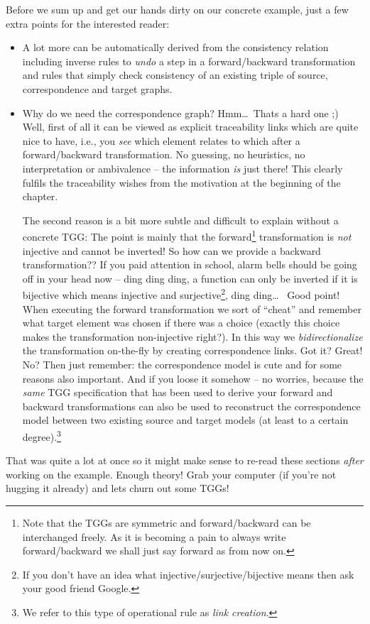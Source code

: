 \clearpage
Before we sum up and get our hands dirty on our concrete example, just a few extra points for the interested reader:  
\begin{itemize}
\item A lot more can be automatically derived from the consistency relation including inverse rules to \emph{undo} a step in a forward/backward transformation~\cite{LAVS_ICGT_2012} and rules that simply check consistency of an existing triple of source, correspondence and target graphs.

\item Why do we need the correspondence graph?  Hmm\dots\, Thats a hard one ;)  Well, first of all it can be viewed as explicit traceability links which are quite nice to have, i.e., you \emph{see} which element relates to which after a forward/backward transformation. 
No guessing, no heuristics, no interpretation or ambivalence -- the information \emph{is} just there!
This clearly fulfils the traceability wishes from the motivation at the beginning of the chapter.

The second reason is a bit more subtle and difficult to explain without a concrete TGG:  The point is mainly that the forward\footnote{Note that the TGGs are symmetric and forward/backward can be interchanged freely.  As it is becoming a pain to always write forward/backward we shall just say forward as from now on.} transformation is \emph{not} injective and cannot be inverted!
So how can we provide a backward transformation??
If you paid attention in school, alarm bells should be going off in your head now -- ding ding ding, a function can only be inverted if it is bijective which means injective and surjective\footnote{If you don't have an idea what injective/surjective/bijective means then ask your good friend Google.}, ding ding\ldots~
Good point!  When executing the forward transformation we sort of ``cheat'' and remember what target element was chosen if there was a choice (exactly this choice makes the transformation non-injective right?).
In this way we \emph{bidirectionalize} the transformation on-the-fly by creating correspondence links.
Got it? Great! No?  Then just remember: the correspondence model is cute and for some reasons also important.
And if you loose it somehow -- no worries, because the \emph{same} TGG specification that has been used to derive your forward and backward transformations can also be used to reconstruct the correspondence model between two existing source and target models (at least to a certain degree).\footnote{We refer to this type of operational rule as \emph{link creation}.}
\end{itemize}

That was quite a lot at once so it might make sense to re-read these sections \emph{after} working on the example.
Enough theory!  Grab your computer (if you're not hugging it already) and lets churn out some TGGs!
